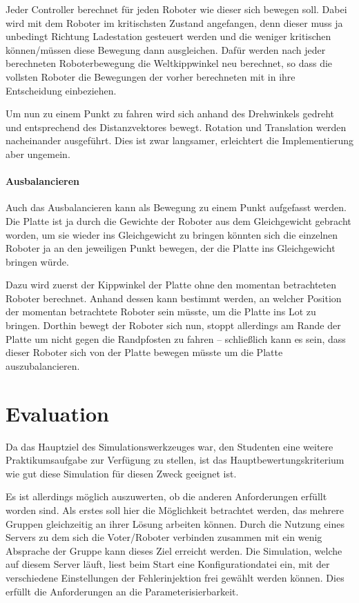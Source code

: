 {Jeder Controller berechnet f{\"{u}}r jeden Roboter wie dieser sich bewegen soll. Dabei wird mit dem Roboter
im kritischsten Zustand angefangen, denn dieser muss ja unbedingt Richtung Ladestation gesteuert werden 
und die weniger kritischen k{\"{o}}nnen/m{\"{u}}ssen diese Bewegung dann ausgleichen. Daf{\"{u}}r werden nach
jeder berechneten Roboterbewegung die Weltkippwinkel neu berechnet, so dass die vollsten Roboter die Bewegungen
der vorher berechneten mit in ihre Entscheidung einbeziehen.


Um nun zu einem Punkt zu fahren wird sich anhand des Drehwinkels gedreht und entsprechend des Distanzvektores 
bewegt. Rotation und Translation werden nacheinander ausgef{\"{u}}hrt. Dies ist zwar langsamer, erleichtert die
Implementierung aber ungemein.

\paragraph{Ausbalancieren} Auch das Ausbalancieren kann als Bewegung zu einem Punkt aufgefasst werden.
Die Platte ist ja durch die Gewichte der Roboter aus dem Gleichgewicht gebracht worden, um sie wieder ins
Gleichgewicht zu bringen k{\"{o}}nnten sich die einzelnen Roboter ja an den jeweiligen Punkt bewegen, der
die Platte ins Gleichgewicht bringen w{\"{u}}rde.

Dazu wird zuerst der Kippwinkel der Platte ohne den momentan betrachteten Roboter berechnet. Anhand dessen
kann bestimmt werden, an welcher Position der momentan betrachtete Roboter sein m{\"{u}}sste, um die Platte
ins Lot zu bringen. Dorthin bewegt der Roboter sich nun, stoppt allerdings am Rande der Platte um nicht
gegen die Randpfosten zu fahren -- schlie{\ss}lich kann es sein, dass dieser Roboter sich von der Platte bewegen m{\"{u}}sste
um die Platte auszubalancieren.

\clearpage
\section{Evaluation}
Da das Hauptziel des Simulationswerkzeuges war, den Studenten eine weitere Praktikumsaufgabe zur Verf{\"{u}}gung
zu stellen, ist das Hauptbewertungskriterium wie gut diese Simulation f{\"{u}}r diesen Zweck geeignet ist.

Es ist allerdings m{\"{o}}glich auszuwerten, ob die anderen Anforderungen erf{\"{u}}llt worden sind. Als erstes
soll hier die M{\"{o}}glichkeit betrachtet werden, das mehrere Gruppen gleichzeitig
an ihrer L{\"{o}}sung arbeiten k{\"{o}}nnen. Durch die Nutzung eines Servers zu dem sich die Voter/Roboter
verbinden zusammen mit ein wenig Absprache der Gruppe kann dieses Ziel erreicht werden.
Die Simulation, welche auf diesem Server l{\"{a}}uft, liest beim Start eine Konfigurationdatei ein, mit der verschiedene Einstellungen
der Fehlerinjektion frei gew{\"{a}}hlt werden k{\"{o}}nnen. Dies erf{\"{u}}llt die Anforderungen an die Parameterisierbarkeit.

}
